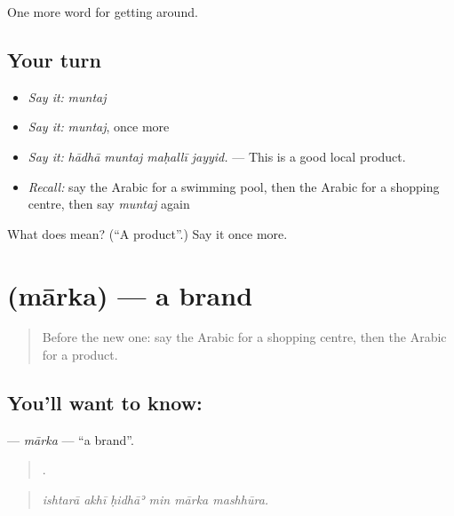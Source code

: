 \begin{grammarlens}[title={What you've built}]
One more word for getting around.
\end{grammarlens}

\subsection*{Your turn}
\begin{itemize}
\raggedright
  \item \emph{Say it:} \emph{muntaj}
  \item \emph{Say it:} \emph{muntaj}, once more
  \item \emph{Say it:} \emph{hādhā muntaj maḥallī jayyid.} — This is a good local product.
  \item \emph{Recall:} say the Arabic for a swimming pool, then the Arabic for a shopping centre, then say \emph{muntaj} again
\end{itemize}

\begin{tcolorbox}[breakable,colback=teal!4,colframe=teal!35!black,title={Before you move on}]
What does  mean? (\textquotedblleft{}A product\textquotedblright{}.) Say it once more.
\end{tcolorbox}
\section[\texorpdfstring{\ar{ماركة} (mārka)}{ماركة (mārka)}]{ (mārka) — a brand}

\label{lesson:AR-C455-marka}



\begin{quote}
Before the new one: say the Arabic for a shopping centre, then the Arabic for a product.
\end{quote}

\subsection*{You'll want to know: }
\textbf{} — \emph{mārka} — \textquotedblleft{}a brand\textquotedblright{}.

\begin{quote}
     .
\end{quote}

\begin{quote}
\emph{ishtarā akhī ḥidhāʾ min mārka mashhūra.}
\end{quote}


